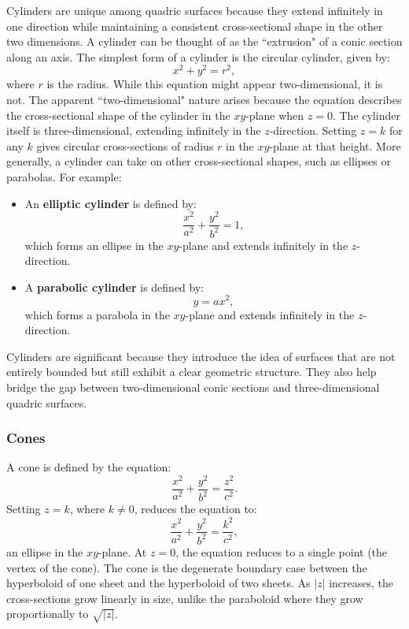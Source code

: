 \noindent Cylinders are unique among quadric surfaces because they extend infinitely in one direction while maintaining a consistent cross-sectional shape in the other two dimensions. A cylinder can be thought of as the ``extrusion" of a conic section along an axis. The simplest form of a cylinder is the circular cylinder, given by:
\[
x^2 + y^2 = r^2,
\]
where \( r \) is the radius. While this equation might appear two-dimensional, it is not. The apparent ``two-dimensional" nature arises because the equation describes the cross-sectional shape of the cylinder in the \( xy \)-plane when \( z = 0 \). The cylinder itself is three-dimensional, extending infinitely in the \( z \)-direction. Setting \( z = k \) for any \( k \) gives circular cross-sections of radius \( r \) in the \( xy \)-plane at that height. More generally, a cylinder can take on other cross-sectional shapes, such as ellipses or parabolas. For example:
\begin{itemize}
    \item An \textbf{elliptic cylinder} is defined by:
    \[
    \frac{x^2}{a^2} + \frac{y^2}{b^2} = 1,
    \]
    which forms an ellipse in the \( xy \)-plane and extends infinitely in the \( z \)-direction.
    \item A \textbf{parabolic cylinder} is defined by:
    \[
    y = ax^2,
    \]
    which forms a parabola in the \( xy \)-plane and extends infinitely in the \( z \)-direction.
\end{itemize}

\noindent Cylinders are significant because they introduce the idea of surfaces that are not entirely bounded but still exhibit a clear geometric structure. They also help bridge the gap between two-dimensional conic sections and three-dimensional quadric surfaces.


\subsubsection*{Cones}

\noindent A cone is defined by the equation:
\[
\frac{x^2}{a^2} + \frac{y^2}{b^2} = \frac{z^2}{c^2}.
\]
\noindent Setting \( z = k \), where \( k \neq 0 \), reduces the equation to:
\[
\frac{x^2}{a^2} + \frac{y^2}{b^2} = \frac{k^2}{c^2},
\]
an ellipse in the \( xy \)-plane. At \( z = 0 \), the equation reduces to a single point (the vertex of the cone). The cone is the degenerate boundary case between the hyperboloid of one sheet and the hyperboloid of two sheets. As \( |z| \) increases, the cross-sections grow linearly in size, unlike the paraboloid where they grow proportionally to \( \sqrt{|z|} \).



